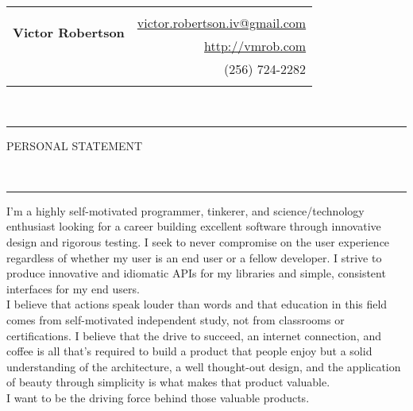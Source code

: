 \documentclass[10pt, letterpaper, oneside]{article}
\makeatletter
\newcommand{\name}{Victor Robertson}
\newcommand{\website}{\href{http://vmrob.com}{http://vmrob.com}}
\newcommand{\phone}{(256) 724-2282}
\newcommand{\email}{\href{mailto:victor.robertson.iv@gmail.com}{victor.robertson.iv@gmail.com}}
\newcommand{\HRule}[2]{\textcolor{#1}{\rule{\linewidth}{#2}}}
\newcommand{\sectiontitle}[1]{\begin{minipage}{\textwidth}\HRule{black}{0.25mm}\vspace{-10pt}\begin{center}\Large\MakeUppercase{#1}\end{center}\end{minipage}\\\HRule{light-grey}{0.15mm}\vspace{\baselineskip}}
\newenvironment{ressection}[1]{
  \sectiontitle{#1}}
  {\vspace{0.5\baselineskip}}
\makeatother
\begin{document}
 
\begin{tabularx}{\linewidth}{X r}
\multirow{3}{*}{\Huge\textbf{\name}} & \\& \email \\& \website \\& \phone \\\\
\end{tabularx}\\

\begin{ressection}{Personal Statement}
    I'm a highly self-motivated programmer, tinkerer, and science/technology enthusiast looking for a career building excellent software through innovative design and rigorous testing. I seek to never compromise on the user experience regardless of whether my user is an end user or a fellow developer. I strive to produce innovative and idiomatic APIs for my libraries and simple, consistent interfaces for my end users.\\

    I believe that actions speak louder than words and that education in this field comes from self-motivated independent study, not from classrooms or certifications. I believe that the drive to succeed, an internet connection, and coffee is all that's required to build a product that people enjoy but a solid understanding of the architecture, a well thought-out design, and the application of beauty through simplicity is what makes that product valuable.\\

    I want to be the driving force behind those valuable products.
\end{ressection}
 
\end{document}

